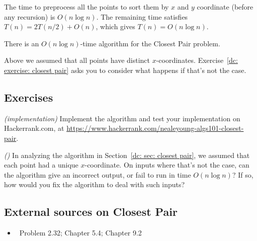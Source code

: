 The time to preprocess all the points 
to sort them by $x$ and $y$ coordinate
(before any recursion)
is $O(n\log n)$.
The remaining time satisfies $T(n) = 2T(n/2) + O(n)$,
which gives $T(n) = O(n\log n)$.

\begin{theorem}
  There is an $O(n\log n)$-time algorithm for the Closest Pair problem.
\end{theorem}

Above we assumed that all points have distinct $x$-coordinates.
Exercise~\ref{dc: exercise: closest pair} asks you to consider what happens if that's not the case.


\subsection{Exercises}

\exercise\emph{(implementation)}
Implement the algorithm and test your implementation on Hackerrank.com, at
\url{https://www.hackerrank.com/nealeyoung-algs101-closest-pair}.

\solution
{}

\exercise\label{dc: exercise: closest pair}\emph{()}
In analyzing the  algorithm in Section~\ref{dc: sec: closest pair},
we assumed that each point had a unique $x$-coordinate.
On inputs where that's not the case,
can the algorithm give an incorrect output, or fail to run in time $O(n\log n)$?
If so, how would you fix the algorithm to deal with such inputs?


\subsection{External sources on Closest Pair}

\begin{itemize}
\item \DPV~Problem 2.32; \KT Chapter 5.4; \CLRS Chapter 9.2
\end{itemize}

